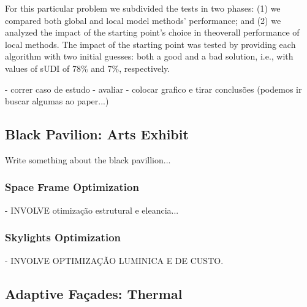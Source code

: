 For this particular problem we subdivided the tests in two phases: (1) we compared both global and local model methods’ performance; and (2) we analyzed the impact of the starting point’s choice in theoverall performance of local methods. The impact of the starting point was tested by providing each algorithm with two initial guesses: both a good and a bad solution, i.e., with values of sUDI of 78\% and 7\%, respectively. 


- correr caso de estudo 
- avaliar 
- colocar grafico e tirar conclusões (podemos ir buscar algumas ao paper...)

\subsection{Black Pavilion: Arts Exhibit}

Write something about the black pavillion...

\subsubsection{Space Frame Optimization}

- INVOLVE otimização estrutural e eleancia...

\subsubsection{Skylights Optimization}

- INVOLVE OPTIMIZAÇÃO LUMINICA E DE CUSTO.


\subsection{Adaptive Façades: Thermal}
